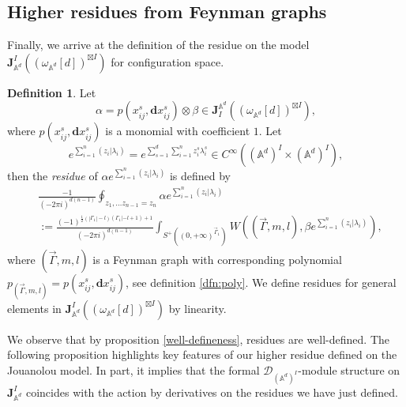 \documentclass[11pt]{amsart}
\theoremstyle{definition}
\newtheorem{defn}[thm]{Definition}
\theoremstyle{remark}
\numberwithin{equation}{section}
\begin{document}
\subsection{Higher residues from Feynman graphs}

Finally, we arrive at the definition of the residue on the model $\mathbf{J}^{ I}_{\mathbb{A}^{d}}((\omega_{\mathbb{A}
^{d}}[d])^{\boxtimes I})$ for configuration space.

\begin{defn}
    Let
    $$
    \alpha=p(x_{ij}^{s},\mathbf{d}x_{ij}^{s})\otimes\beta\in \mathbf{J}_{ I}^{\mathbb{A}^{d}}((\omega_{\mathbb{A}^{d}}[d])^{\boxtimes I}),
    $$
    where $p(x_{ij}^{s},\mathbf{d}x_{ij}^{s})$ is a monomial with coefficient $1$.
    Let
    $$
    e^{\sum\limits_{i=1}^{n}(z_{i}|\lambda_{i})}=e^{\sum\limits_{s=1}^{d}\sum\limits_{i=1}^{n}z^{s}_{i}\lambda^{s}_{i}}\in C^{\infty}((\mathbb{A}^{d})^{ I}\times (\mathbb{A}^{d})^{ I}),
    $$
    then the \textit{residue} of $\alpha e^{\sum\limits_{i=1}^{n}(z_{i}|\lambda_{i})}$ is defined by
    \begin{align*}
        &\frac{-1}{(-2\pi i)^{d(n-1)}}\oint_{z_{1},\dots z_{n-1}=z_{n}}\alpha e^{\sum\limits_{i=1}^{n}(z_{i}|\lambda_{i})}\\
        &:=\frac{(-1)^{\frac{1}{2}(|\Gamma_{1}|-l)(\Gamma_{1}|-l+1)+1}}{(-2\pi i)^{d(n-1)}}\int_{S^{+}((0,+\infty)^{\vec{\Gamma}_{1}})}W((\vec{\Gamma},m,l),\beta e^{\sum\limits_{i=1}^{n}(z_{i}|\lambda_{i})}),
    \end{align*}
    where $(\vec{\Gamma},m,l)$ is a Feynman graph with corresponding polynomial $p_{(\vec{\Gamma},m,l)}=p(x_{ij}^{s},
    \mathbf{d}x_{ij}^{s})$, see definition \ref{dfn:poly}.
    We define residues for general elements in $\mathbf{J}^{ I}_{\mathbb{A}^{d}}((\omega_{\mathbb{A}^{d}}[d])^{\boxtimes
    I})$ by linearity.
\end{defn}


We observe that by proposition \ref{well-defineness}, residues are well-defined.
The following proposition highlights key features of our higher residue defined on the Jouanolou model.
In part, it implies that the formal $\mathcal{D}_{(\mathbb{A}^{d})^{ I}}$-module structure on $\mathbf{J}^{ I}_{\mathbb{A}^{d}}$ coincides with the action by derivatives on the residues we have just defined.
\end{document}
